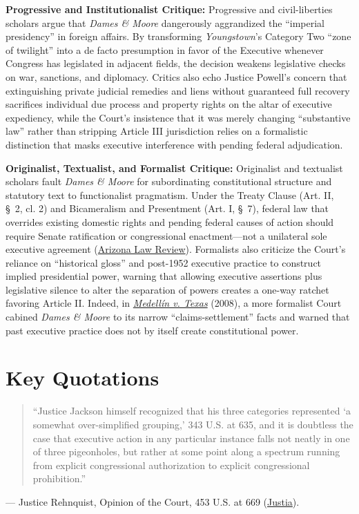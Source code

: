 \documentclass[12pt]{article}
\begin{document}
\textbf{Progressive and Institutionalist Critique:} Progressive and civil-liberties scholars argue that \textit{Dames \& Moore} dangerously aggrandized the ``imperial presidency'' in foreign affairs. By transforming \textit{Youngstown}'s Category Two ``zone of twilight'' into a de facto presumption in favor of the Executive whenever Congress has legislated in adjacent fields, the decision weakens legislative checks on war, sanctions, and diplomacy. Critics also echo Justice Powell's concern that extinguishing private judicial remedies and liens without guaranteed full recovery sacrifices individual due process and property rights on the altar of executive expediency, while the Court's insistence that it was merely changing ``substantive law'' rather than stripping Article III jurisdiction relies on a formalistic distinction that masks executive interference with pending federal adjudication.

\textbf{Originalist, Textualist, and Formalist Critique:} Originalist and textualist scholars fault \textit{Dames \& Moore} for subordinating constitutional structure and statutory text to functionalist pragmatism. Under the Treaty Clause (Art. II, \S\ 2, cl. 2) and Bicameralism and Presentment (Art. I, \S\ 7), federal law that overrides existing domestic rights and pending federal causes of action should require Senate ratification or congressional enactment---not a unilateral sole executive agreement (\href{https://arizonalawreview.org/pdf/51-4/51arizlrev1035.pdf}{Arizona Law Review}). Formalists also criticize the Court's reliance on ``historical gloss'' and post-1952 executive practice to construct implied presidential power, warning that allowing executive assertions plus legislative silence to alter the separation of powers creates a one-way ratchet favoring Article II. Indeed, in \href{https://supreme.justia.com/cases/federal/us/552/491/}{\textit{Medell\'in v. Texas}} (2008), a more formalist Court cabined \textit{Dames \& Moore} to its narrow ``claims-settlement'' facts and warned that past executive practice does not by itself create constitutional power.

\section{Key Quotations}
\begin{quote}
``Justice Jackson himself recognized that his three categories represented `a somewhat over-simplified grouping,' 343 U.S. at 635, and it is doubtless the case that executive action in any particular instance falls not neatly in one of three pigeonholes, but rather at some point along a spectrum running from explicit congressional authorization to explicit congressional prohibition.''
\end{quote}
\noindent --- Justice Rehnquist, Opinion of the Court, 453 U.S. at 669 (\href{https://supreme.justia.com/cases/federal/us/453/654/}{Justia}).
\end{document}

